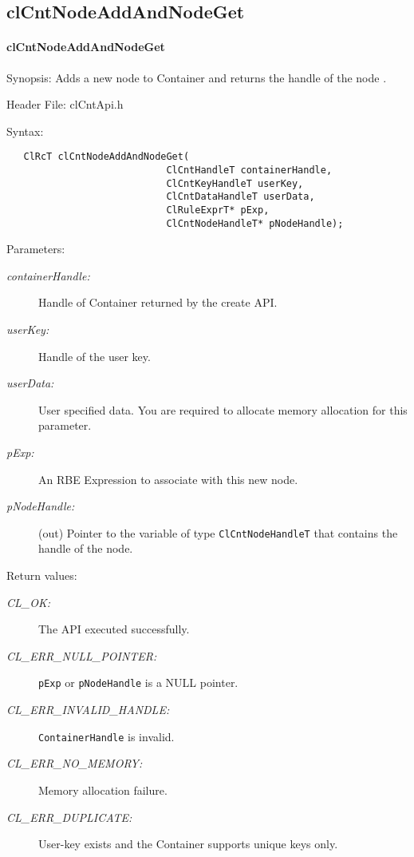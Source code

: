 \subsection{clCntNodeAddAndNodeGet}
\hypertarget{pagecnt104}{}\paragraph{cl\-Cnt\-Node\-Add\-And\-Node\-Get}\label{pagecnt104}
\begin{Desc}
\item[Synopsis:]Adds a new node to Container and returns the handle of the node .\end{Desc}
\begin{Desc}
\item[Header File:]clCntApi.h\end{Desc}
\begin{Desc}
\item[Syntax:]

\footnotesize\begin{verbatim}   ClRcT clCntNodeAddAndNodeGet(
                  			ClCntHandleT containerHandle,
                  			ClCntKeyHandleT userKey,	
                  			ClCntDataHandleT userData,
                  			ClRuleExprT* pExp,
                  			ClCntNodeHandleT* pNodeHandle);
\end{verbatim}
\normalsize
\end{Desc}
\begin{Desc}
\item[Parameters:]
\begin{description}
\item[{\em container\-Handle:}]Handle of Container returned by the create API. 
\item[{\em user\-Key:}]Handle of the user key. 
\item[{\em user\-Data:}]User specified data. You are required to allocate memory allocation for this parameter.
\item[{\em p\-Exp:}]An RBE Expression to associate with this new node. 
\item[{\em p\-Node\-Handle:}](out) Pointer to the variable of type {\tt{ClCntNodeHandleT}} that contains the handle of the node.
\end{description}
\end{Desc}
\begin{Desc}
\item[Return values:]
\begin{description}
\item[{\em CL\_\-OK:}]The API executed successfully. 
\item[{\em CL\_\-ERR\_\-NULL\_\-POINTER:}] {\tt{pExp}} or {\tt{pNodeHandle}} is a NULL pointer. 
\item[{\em CL\_\-ERR\_\-INVALID\_\-HANDLE:}] {\tt{ContainerHandle}} is invalid.
\item[{\em CL\_\-ERR\_\-NO\_\-MEMORY:}]Memory allocation failure. 
\item[{\em CL\_\-ERR\_\-DUPLICATE:}]User-key exists and the Container supports unique keys only.\end{description}
\end{Desc}
